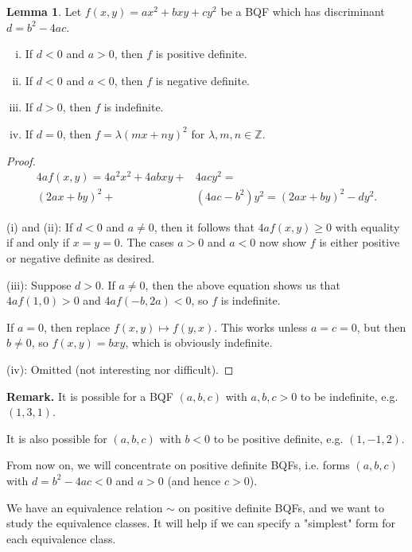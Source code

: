 \documentclass{article}
\theoremstyle{definition}
\newtheorem{lemma}[theorem]{Lemma}
\begin{document}
\begin{lemma}
    Let $f(x,y)=ax^2+bxy+cy^2$ be a BQF which has discriminant $d=b^2-4ac$. 
    \begin{enumerate}[(i)]
        \item If $d<0$ and $a>0$, then $f$ is positive definite.
        \item If $d<0$ and $a<0$, then $f$ is negative definite.
        \item If $d>0$, then $f$ is indefinite.
        \item If $d=0$, then $f= \lambda(mx+ny)^2$ for $\lambda,m,n \in \mathbb{Z}$.
    \end{enumerate}
\end{lemma}
\begin{proof}
    \begin{align*}
        4af(x,y)=4a^2x^2+4abxy+&4acy^2 = \\ 
        (2ax+by)^2 + &(4ac-b^2)y^2 = (2ax+by)^2 - dy^2.
    \end{align*}

    (i) and (ii): If $d<0$ and $a\neq 0$, then it follows that $4af(x,y)\ge 0$ with equality if and only if $x=y=0$. The cases $a>0$ and $a<0$ now show $f$ is either positive or negative definite as desired.
    \vspace{1mm}
    
    (iii): Suppose $d>0$. If $a\neq 0$, then the above equation shows us that $4af(1,0)>0$ and $4af(-b,2a)<0$, so $f$ is indefinite. 
    
    If $a=0$, then replace $f(x,y) \mapsto f(y,x)$. This works unless $a=c=0$, but then $b\neq 0$, so $f(x,y)=bxy$, which is obviously indefinite.
    \vspace{1mm}
    
    (iv): Omitted (not interesting nor difficult).
\end{proof}

\textbf{Remark.} It is possible for a BQF $(a,b,c)$ with $a,b,c>0$ to be indefinite, e.g. $(1,3,1)$.

It is also possible for $(a,b,c)$ with $b<0$ to be positive definite, e.g. $(1,-1,2)$.
\vspace{1mm}

From now on, we will concentrate on positive definite BQFs, i.e. forms $(a,b,c)$ with $d=b^2-4ac<0$ and $a>0$ (and hence $c>0$).

We have an equivalence relation $\sim$ on positive definite BQFs, and we want to study the equivalence classes. It will help if we can specify a "simplest" form for each equivalence class.
\end{document}
